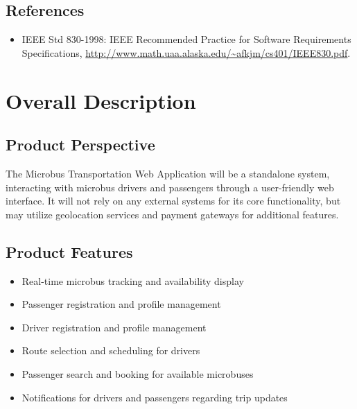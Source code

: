 \documentclass{BusMateSRS}
\begin{document}
\section{References}
\begin{itemize}
	\item IEEE Std 830-1998: IEEE Recommended Practice for Software Requirements
	      Specifications, \url{http://www.math.uaa.alaska.edu/~afkjm/cs401/IEEE830.pdf}.
\end{itemize}



\chapter{Overall Description}
\section{Product Perspective}
The Microbus Transportation Web Application will be a standalone system,
interacting with microbus drivers and passengers through a user-friendly
web interface. It will not rely on any external systems for its core
functionality, but may utilize geolocation services and payment gateways for
additional features.

\section{Product Features}
\begin{itemize}
	\item Real-time microbus tracking and availability display
	\item Passenger registration and profile management
	\item Driver registration and profile management
	\item Route selection and scheduling for drivers
	\item Passenger search and booking for available microbuses
	\item Notifications for drivers and passengers regarding trip updates
\end{itemize}
\end{document}
